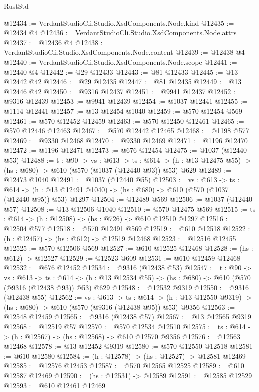 \begin{lexlean}{RustStd}
\begin{coremodule}
@12434 := VerdantStudioCli.Studio.XsdComponents.Node.kind
@12435 := @12434 @4
@12436 := VerdantStudioCli.Studio.XsdComponents.Node.attrs
@12437 := @12436 @4
@12438 := VerdantStudioCli.Studio.XsdComponents.Node.content
@12439 := @12438 @4
@12440 := VerdantStudioCli.Studio.XsdComponents.Node.scope
@12441 := @12440 @4
@12442 := @29 @12433
@12443 := @81 @12433
@12445 := @13 @12442 @42
@12446 := @29 @12435
@12447 := @81 @12435
@12449 := @13 @12446 @42
@12450 := @9316 @12437
@12451 := @9941 @12437
@12452 := @9316 @12439
@12453 := @9941 @12439
@12454 := @1037 @12441
@12455 := @1114 @12441
@12457 := @13 @12454 @1040
@12459 := @570 @12454 @569
@12461 := @570 @12452 @12459
@12463 := @570 @12450 @12461
@12465 := @570 @12446 @12463
@12467 := @570 @12442 @12465
@12468 := @1198 @577
@12469 := @9330 @12468
@12470 := @9330 @12469
@12471 := @1196 @12470
@12472 := @1196 @12471
@12473 := @676 @12454
@12475 := @1037 (@12440 @53)
@12488 := {t : @90} ->
  {vs : @613} ->
  {ts : @614} -> (h : @13 @12475 @55) -> (hs : @680) -> @610 (@570 (@1037 (@12440 @93)) @53) @629
@12489 := @12473 @1040
@12491 := @1037 (@12440 @55)
@12503 := {vs : @613} ->
  {ts : @614} -> (h : @13 @12491 @1040) -> (hs : @680) -> @610 (@570 (@1037 (@12440 @95)) @53) @1297
@12504 := @12489 @569
@12506 := @1037 (@12440 @57)
@12508 := @13 @12506 @1040
@12510 := @570 @12475 @569
@12515 := {ts : @614} -> (h : @12508) -> (hs : @726) -> @610 @12510 @1297
@12516 := @12504 @577
@12518 := @570 @12491 @569
@12519 := @610 @12518
@12522 := (h : @12457) -> (hs : @612) -> @12519 @12468
@12523 := @12516 @12455
@12525 := @570 @12506 @569
@12527 := @610 @12525 @12468
@12528 := (hs : @612) -> @12527
@12529 := @12523 @609
@12531 := @610 @12459 @12468
@12532 := @676 @12452
@12534 := @9316 (@12438 @53)
@12547 := {t : @90} ->
  {vs : @613} ->
  {ts : @614} -> (h : @13 @12534 @55) -> (hs : @680) -> @610 (@570 (@9316 (@12438 @93)) @53) @629
@12548 := @12532 @9319
@12550 := @9316 (@12438 @55)
@12562 := {vs : @613} ->
  {ts : @614} -> (h : @13 @12550 @9319) -> (hs : @680) -> @610 (@570 (@9316 (@12438 @95)) @53) @9356
@12563 := @12548 @12459
@12565 := @9316 (@12438 @57)
@12567 := @13 @12565 @9319
@12568 := @12519 @57
@12570 := @570 @12534 @12510
@12575 := {ts : @614} -> (h : @12567) -> (hs : @12568) -> @610 @12570 @9356
@12576 := @12563 @12468
@12578 := @13 @12452 @9319
@12580 := @570 @12550 @12518
@12581 := @610 @12580
@12584 := (h : @12578) -> (hs : @12527) -> @12581 @12469
@12585 := @12576 @12453
@12587 := @570 @12565 @12525
@12589 := @610 @12587 @12469
@12590 := (hs : @12531) -> @12589
@12591 := @12585 @12529
@12593 := @610 @12461 @12469

\end{coremodule}
\end{lexlean}
